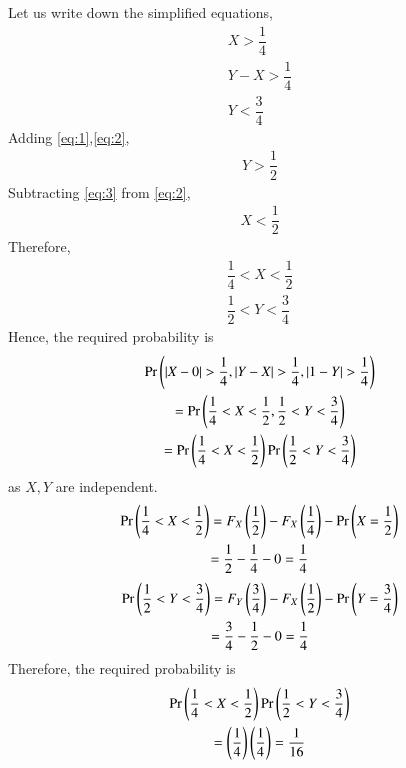 \documentclass[journal,12pt,twocolumn]{IEEEtran}
\begin{document}
Let us write down the simplified equations,
\begin{align}
    \label{eq:1}
    X>\dfrac{1}{4}\\
    \label{eq:2}
    Y-X>\dfrac{1}{4}\\
    \label{eq:3}
    Y<\dfrac{3}{4}
\end{align}
Adding \eqref{eq:1},\eqref{eq:2},
\begin{align}
    \label{eq:4}
    Y>\dfrac{1}{2}
\end{align}
Subtracting \eqref{eq:3} from \eqref{eq:2},
\begin{align}
    \label{eq:5}
    X<\dfrac{1}{2}
\end{align}
Therefore, 
\begin{align}
    \label{eq:6}
    \dfrac{1}{4}<X<\dfrac{1}{2}\\
    \label{eq:7}
    \dfrac{1}{2}<Y<\dfrac{3}{4}
\end{align}
Hence, the required probability is
\begin{multline}
    \pr{|X-0|>\dfrac{1}{4},|Y-X|>\dfrac{1}{4},|1-Y|>\dfrac{1}{4}}\\=\pr{\frac{1}{4}<X<\frac{1}{2},\frac{1}{2}<Y<\frac{3}{4}}\\=\pr{\frac{1}{4}<X<\frac{1}{2}}\pr{\frac{1}{2}<Y<\frac{3}{4}}
\end{multline}
as $X,Y$ are independent.
\begin{multline}
    \Pr\left(\frac{1}{4}<X<\frac{1}{2}\right)=F_{X}\left(\frac{1}{2}\right)-F_{X}\left(\frac{1}{4}\right)-\Pr\left(X=\dfrac{1}{2}\right)\\=\frac{1}{2}-\frac{1}{4}-0=\frac{1}{4}
\end{multline}
\begin{multline}
    \Pr\left(\frac{1}{2}<Y<\frac{3}{4}\right)=F_{Y}\left(\frac{3}{4}\right)-F_{X}\left(\frac{1}{2}\right)-\Pr\left(Y=\dfrac{3}{4}\right)\\=\frac{3}{4}-\frac{1}{2}-0=\frac{1}{4}
\end{multline}
Therefore, the required probability is 
\begin{multline}
    \Pr\left(\frac{1}{4}<X<\frac{1}{2}\right)\Pr\left(\frac{1}{2}<Y<\frac{3}{4}\right)\\=\left(\frac{1}{4}\right)\left(\frac{1}{4}\right)=\frac{1}{16}
\end{multline}
\end{document}
